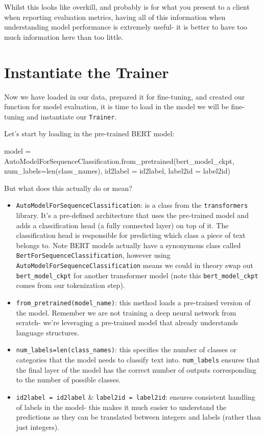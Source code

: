 \documentclass[
  letterpaper,
  DIV=11,
  numbers=noendperiod]{scrreprt}
\newenvironment{Shaded}{\begin{snugshade}}{\end{snugshade}}
\newcommand{\BuiltInTok}[1]{\textcolor[rgb]{0.00,0.23,0.31}{#1}}
\newcommand{\NormalTok}[1]{\textcolor[rgb]{0.00,0.23,0.31}{#1}}
\newcommand{\OperatorTok}[1]{\textcolor[rgb]{0.37,0.37,0.37}{#1}}
\providecommand{\tightlist}{%
  \setlength{\itemsep}{0pt}\setlength{\parskip}{0pt}}\usepackage{longtable,booktabs,array}
\begin{document}
Whilst this looks like overkill, and probably is for what you present to
a client when reporting evaluation metrics, having all of this
information when understanding model performance is extremely useful- it
is better to have too much information here than too little.

\section{Instantiate the Trainer}\label{instantiate-the-trainer}

Now we have loaded in our data, prepared it for fine-tuning, and created
our function for model evaluation, it is time to load in the model we
will be fine-tuning and instantiate our \texttt{Trainer}.

Let's start by loading in the pre-trained BERT model:

\begin{Shaded}
\begin{Highlighting}[]
\NormalTok{model }\OperatorTok{=}\NormalTok{ AutoModelForSequenceClassification.from\_pretrained(bert\_model\_ckpt, num\_labels}\OperatorTok{=}\BuiltInTok{len}\NormalTok{(class\_names), id2label }\OperatorTok{=}\NormalTok{ id2label, label2id }\OperatorTok{=}\NormalTok{ label2id)}
\end{Highlighting}
\end{Shaded}

But what does this actually do or mean?

\begin{itemize}
\tightlist
\item
  \texttt{AutoModelForSequenceClassification}: is a class from the
  \texttt{transformers} library. It's a pre-defined architecture that
  uses the pre-trained model and adds a classification head (a fully
  connected layer) on top of it. The classification head is responsible
  for predicting which class a piece of text belongs to. Note BERT
  models actually have a synonymous class called
  \texttt{BertForSequenceClassification}, however using
  \texttt{AutoModelForSequenceClassification} means we could in theory
  swap out \texttt{bert\_model\_ckpt} for another transformer model
  (note this \texttt{bert\_model\_ckpt} comes from our tokenization
  step).
\item
  \texttt{from\_pretrained(model\_name)}: this method loads a
  pre-trained version of the model. Remember we are not training a deep
  neural network from scratch- we're leveraging a pre-trained model that
  already understands language structures.
\item
  \texttt{num\_labels=len(class\_names)}: this specifies the number of
  classes or categories that the model needs to classify text into.
  \texttt{num\_labels} ensures that the final layer of the model has the
  correct number of outputs corresponding to the number of possible
  classes.
\item
  \texttt{id2label\ =\ id2label} \& \texttt{label2id\ =\ label2id}:
  ensures consistent handling of labels in the model- this makes it much
  easier to understand the predictions as they can be translated between
  integers and labels (rather than just integers).
\end{itemize}
\end{document}

